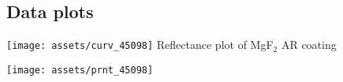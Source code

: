 \documentclass{article}
\begin{document}
\begin{multicols}{2}
\section{Data plots}

\begin{center}
\texttt{[image: assets/curv\_45098]}
Reflectance plot of MgF$_{2}$ AR coating
\end{center}


\end{multicols}

\begin{center}
\texttt{[image: assets/prnt\_45098]}
\end{center}
\end{document}
